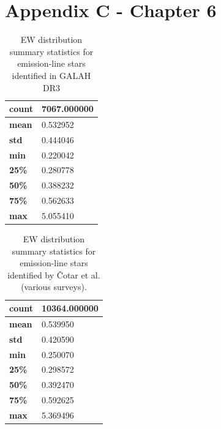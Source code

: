 \section{Appendix C - Chapter 6}

\begin{table}[!htb]
\begin{center}
\begin{tabular}{|l|l|}
\hline
\textbf{count} & 7067.000000 \\ \hline
\textbf{mean} & 0.532952 \\ \hline
\textbf{std} & 0.444046 \\ \hline
\textbf{min} & 0.220042 \\ \hline
\textbf{25\%} & 0.280778 \\ \hline
\textbf{50\%} & 0.388232 \\ \hline
\textbf{75\%} & 0.562633 \\ \hline
\textbf{max} & 5.055410 \\ \hline
\end{tabular}
\caption{EW distribution summary statistics for emission-line stars identified in GALAH DR3}
\label{table:draglift1}
\end{center}
\end{table}

\begin{table}[!htb]
\begin{center}
\begin{tabular}{|l|l|}
\hline
\textbf{count} & 10364.000000 \\ \hline
\textbf{mean} & 0.539950 \\ \hline
\textbf{std} & 0.420590 \\ \hline
\textbf{min} & 0.250070 \\ \hline
\textbf{25\%} & 0.298572 \\ \hline
\textbf{50\%} & 0.392470 \\ \hline
\textbf{75\%} & 0.592625 \\ \hline
\textbf{max} & 5.369496 \\ \hline
\end{tabular}
\caption{EW distribution summary statistics for emission-line stars identified by Čotar et al. (various surveys).}
\label{table:draglift1}
\end{center}
\end{table}

